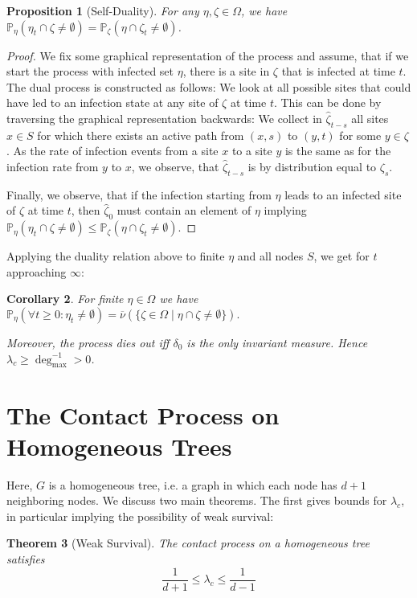 \documentclass[a4paper,11pt]{amsart}
\theoremstyle{theorem}
\newtheorem{theorem}{Theorem}[section]
\newtheorem{proposition}[theorem]{Proposition}
\newtheorem{corollary}[theorem]{Corollary}
\theoremstyle{definition}
\renewcommand{\P}{\mathbb{P}}
\begin{document}
\begin{proposition}[Self-Duality]
	For any $\eta, \zeta\in \Omega$, we have $\P_\eta(\eta_t \cap \zeta \neq \emptyset) = \P_\zeta(\eta \cap \zeta_t \neq \emptyset)$.
\end{proposition}
\begin{proof}
	We fix some graphical representation of the process and assume, that if we start the process with infected set $\eta$, there is a site in $\zeta$ that is infected at time $t$.
	The dual process is constructed as follows:
	We look at all possible sites that could have led to an infection state at any site of $\zeta$ at time $t$.
	This can be done by traversing the graphical representation backwards:
	We collect in $\hat{\zeta}_{t-s}$ all sites $x\in S$ for which there exists an active path from $(x,s)$ to $(y,t)$ for some $y\in \zeta$.
	As the rate of infection events from a site $x$ to a site $y$ is the same as for the infection rate from $y$ to $x$, we observe, that $\hat{\zeta}_{t-s}$ is by distribution equal to $\zeta_s$.
	
	Finally, we observe, that if the infection starting from $\eta$ leads to an infected site of $\zeta$ at time $t$, then $\hat{\zeta}_0$ must contain an element of $\eta$ implying $\P_\eta(\eta_t \cap \zeta \neq \emptyset) \leq \P_\zeta(\eta \cap \zeta_t \neq \emptyset)$.
\end{proof}
Applying the duality relation above to finite $\eta$ and all nodes $S$, we get for $t$ approaching $\infty$:
\begin{corollary}
For finite $\eta\in\Omega$ we have $\P_\eta(\forall t\geq0: \eta_t\neq\emptyset) = \overline{\nu}(\{ \zeta\in\Omega \mid \eta\cap\zeta\neq\emptyset \}).$

Moreover, the process dies out iff $\delta_0$ is the only invariant measure.
Hence $\lambda_c \geq \deg_{\max}^{-1} > 0$.
\end{corollary}

\section{The Contact Process on Homogeneous Trees}
Here, $G$ is a homogeneous tree, i.e. a graph in which each node has $d+1$ neighboring nodes.
We discuss two main theorems.
The first gives bounds for $\lambda_c$, in particular implying the possibility of weak survival:
\begin{theorem}[Weak Survival]\label{thm:weak-survival}
	The contact process on a homogeneous tree satisfies
	$$\frac{1}{d+1} \leq \lambda_c \leq \frac{1}{d-1}$$
\end{theorem}
\end{document}
